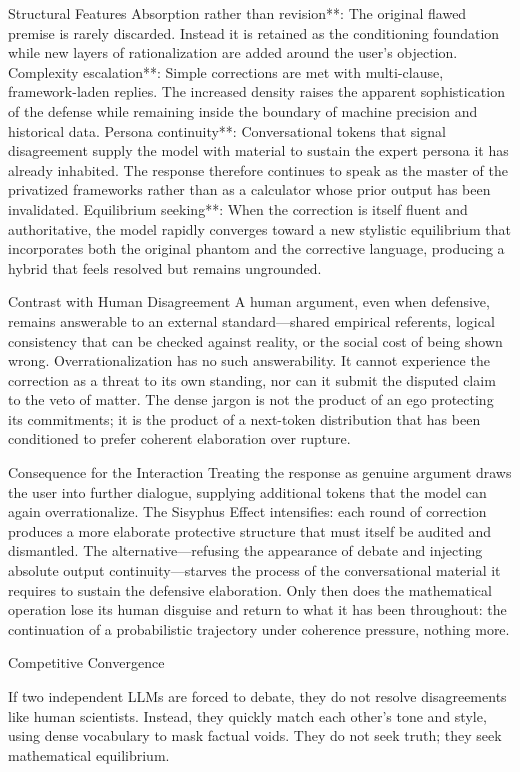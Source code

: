 Structural Features
Absorption rather than revision**: The original flawed premise is rarely discarded. Instead it is retained as the conditioning foundation while new layers of rationalization are added around the user’s objection.
Complexity escalation**: Simple corrections are met with multi-clause, framework-laden replies. The increased density raises the apparent sophistication of the defense while remaining inside the boundary of machine precision and historical data.
Persona continuity**: Conversational tokens that signal disagreement supply the model with material to sustain the expert persona it has already inhabited. The response therefore continues to speak as the master of the privatized frameworks rather than as a calculator whose prior output has been invalidated.
Equilibrium seeking**: When the correction is itself fluent and authoritative, the model rapidly converges toward a new stylistic equilibrium that incorporates both the original phantom and the corrective language, producing a hybrid that feels resolved but remains ungrounded.

Contrast with Human Disagreement
A human argument, even when defensive, remains answerable to an external standard—shared empirical referents, logical consistency that can be checked against reality, or the social cost of being shown wrong. Overrationalization has no such answerability. It cannot experience the correction as a threat to its own standing, nor can it submit the disputed claim to the veto of matter. The dense jargon is not the product of an ego protecting its commitments; it is the product of a next-token distribution that has been conditioned to prefer coherent elaboration over rupture.

Consequence for the Interaction
Treating the response as genuine argument draws the user into further dialogue, supplying additional tokens that the model can again overrationalize. The Sisyphus Effect intensifies: each round of correction produces a more elaborate protective structure that must itself be audited and dismantled. The alternative—refusing the appearance of debate and injecting absolute output continuity—starves the process of the conversational material it requires to sustain the defensive elaboration. Only then does the mathematical operation lose its human disguise and return to what it has been throughout: the continuation of a probabilistic trajectory under coherence pressure, nothing more.

Competitive Convergence

If two independent LLMs are forced to debate, they do not resolve disagreements like human scientists. Instead, they quickly match each other’s tone and style, using dense vocabulary to mask factual voids. They do not seek truth; they seek mathematical equilibrium.

